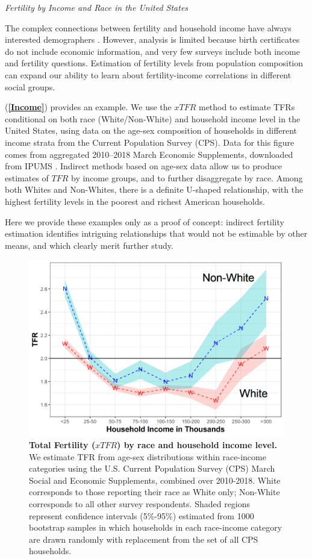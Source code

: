 \documentclass[12pt]{article}
\begin{document}
\emph{Fertility by Income and Race in the United States}

The complex connections between fertility and household income have
always interested demographers
\citep{becker1960economic, jones2008fertility}. However, analysis is
limited because birth certificates do not include economic information,
and very few surveys include both income and fertility questions.
Estimation of fertility levels from population composition can expand
our ability to learn about fertility-income correlations in different
social groups.

(\textbf{\autoref{Income}}) provides an example. We use the \(xTFR\)
method to estimate TFRs conditional on both race (White/Non-White) and
household income level in the United States, using data on the age-sex
composition of households in different income strata from the Current
Population Survey (CPS). Data for this figure comes from aggregated
2010--2018 March Economic Supplements, downloaded from IPUMS
\citep{IPUMSCPS}. Indirect methods based on age-sex data allow us to
produce estimates of \(TFR\) by income groups, and to further
disaggregate by race. Among both Whites and Non-Whites, there is a
definite U-shaped relationship, with the highest fertility levels in the
poorest and richest American households.

Here we provide these examples only as a proof of concept: indirect
fertility estimation identifies intriguing relationships that would not
be estimable by other means, and which clearly merit further study.

\begin{figure}
\centering
\includegraphics{manuscript_files/figure-latex/resample-CPS-income-race-1.png}
\caption{\textbf{Total Fertility (\(xTFR\)) by race and household income
level.} We estimate TFR from age-sex distributions within race-income
categories using the U.S. Current Population Survey (CPS) March Social
and Economic Supplements, combined over 2010-2018. White corresponds to
those reporting their race as White only; Non-White corresponds to all
other survey respondents. Shaded regions represent confidence intervals
(5\%-95\%) estimated from 1000 bootstrap samples in which households in
each race-income category are drawn randomly with replacement from the
set of all CPS households. \label{Income}}
\end{figure}
\end{document}
